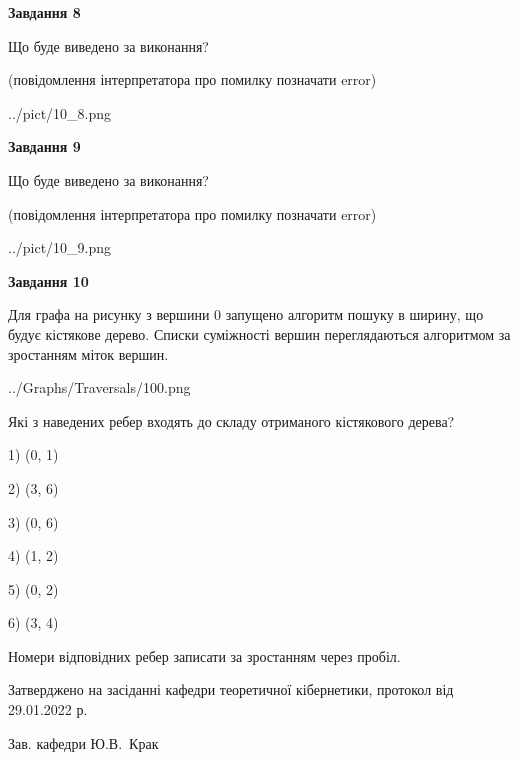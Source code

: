 \documentclass[12pt, ukrainian]{article}
\begin{document}
{\begin {large}
{\begin {center}\textbf{Завдання 8}\end {center}}\par
Що буде виведено за виконання?\par
 (повідомлення інтерпретатора про помилку позначати error)
\begin{center}
	{../pict/10_8.png}
\end{center}
\newpage

{\begin {center}\textbf{Завдання 9}\end {center}}\par
Що буде виведено за виконання?\par
 (повідомлення інтерпретатора про помилку позначати error)\par
\begin{center}
	{../pict/10_9.png}
\end{center}
\newpage

{\begin {center}\textbf{Завдання 10}\end {center}}\par
Для графа на рисунку з вершини 0 запущено алгоритм пошуку в ширину, що будує кістякове дерево. Списки суміжності вершин переглядаються алгоритмом за зростанням міток вершин.\par
\begin{center}
	{../Graphs/Traversals/100.png}
\end{center}
\par Які з наведених ребер входять до складу отриманого кістякового дерева?\par
1) (0, 1)\par
2) (3, 6)\par
3) (0, 6)\par
4) (1, 2)\par
5) (0, 2)\par
6) (3, 4)\par
{\vskip 15pt} Номери відповідних ребер записати за зростанням через пробіл.\par
\newpage


\end {large}
}
{\smallskip \begin {small} Затверджено на засіданні кафедри теоретичної кібернетики, протокол  від   29.01.2022 р.\par\smallskip\smallskip
{\parbox {6.5 cm}{Зав. кафедри \dotfill Ю.В.~Крак}} \end{small}}
\end{document}
